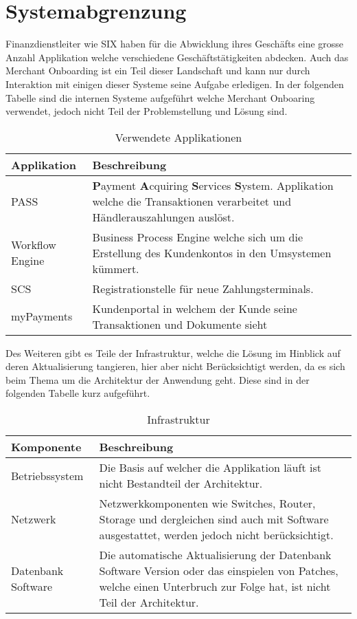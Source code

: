 \section{Systemabgrenzung}
\label{Abgrenzung}

Finanzdienstleiter wie SIX haben für die Abwicklung ihres Geschäfts eine grosse Anzahl Applikation welche verschiedene Geschäftstätigkeiten abdecken. Auch das Merchant Onboarding ist ein Teil dieser Landschaft und kann nur durch Interaktion mit einigen dieser Systeme seine Aufgabe erledigen. In der folgenden Tabelle sind die internen Systeme aufgeführt welche Merchant Onboaring verwendet, jedoch nicht Teil der Problemstellung und Lösung sind.
\begin{table}[H]
	\centering
	\caption{Verwendete Applikationen}
	\begin{tabular}{ | p{3cm} | p{12cm} | }
		\toprule
		{\textbf{Applikation}} & {\textbf{Beschreibung}} \\
		\midrule
		PASS & \textbf{P}ayment \textbf{A}cquiring \textbf{S}ervices \textbf{S}ystem. Applikation welche die Transaktionen verarbeitet und Händlerauszahlungen auslöst. \\ \hline
		Workflow Engine & Business Process Engine welche sich um die Erstellung des Kundenkontos in den Umsystemen kümmert.\\ \hline
		SCS & Registrationstelle für neue Zahlungsterminals.\\ \hline
		myPayments & Kundenportal in welchem der Kunde seine Transaktionen und Dokumente sieht \\
		\bottomrule
	\end{tabular}
\end{table}
\noindent Des Weiteren gibt es Teile der Infrastruktur, welche die Lösung im Hinblick auf deren Aktualisierung tangieren, hier aber nicht Berücksichtigt werden, da es sich beim Thema um die Architektur der Anwendung geht. Diese sind in der folgenden Tabelle kurz aufgeführt.

\begin{table}[H]
	\centering
	\caption{Infrastruktur}
	\begin{tabular}{ | p{3cm} | p{12cm} | }
		\toprule
		{\textbf{Komponente}} & {\textbf{Beschreibung}} \\
		\midrule
		Betriebssystem & Die Basis auf welcher die Applikation läuft ist nicht Bestandteil der Architektur. \\ \hline
		Netzwerk & Netzwerkkomponenten wie Switches, Router, Storage und dergleichen sind auch mit Software ausgestattet, werden jedoch nicht berücksichtigt.\\ \hline
		Datenbank Software & Die automatische Aktualisierung der Datenbank Software Version oder das einspielen von Patches, welche einen Unterbruch zur Folge hat, ist nicht Teil der Architektur. \\
		\bottomrule
	\end{tabular}
\end{table}

